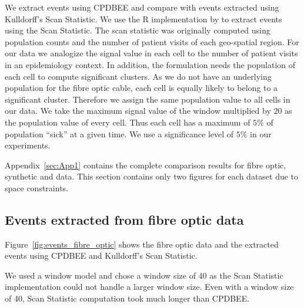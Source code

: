 \documentclass[a4paper,11pt]{article}
\begin{document}
We extract events using CPDBEE and compare with events extracted using Kulldorff's Scan Statistic. We use the R implementation by \cite{spatialepi} to extract events using the Scan Statistic. The scan statistic was originally computed using population counts and the number of patient visits of each geo-spatial region. For our data we analogize the signal value in each cell to the number of patient visits in an epidemiology context. In addition, the formulation needs the population of each cell to compute significant clusters. As we do not have an underlying population for the fibre optic cable, each cell is equally likely to belong to a significant cluster. Therefore we assign the same population value to all cells in our data. We take the maximum signal value of the window multiplied by $20$ as the population value of every cell. Thus each cell has a maximum of $5\%$ of population ``sick'' at a given time. We use a significance level of $5\%$ in our experiments.

Appendix~\ref{sec:App1}  contains the complete comparison results for fibre optic, synthetic and  data. This section  contains only two figures for each dataset due to space constraints.

\subsection{Events extracted from fibre optic data}\label{subsec:eventsFibre}

Figure~\ref{fig:events_fibre_optic} shows the fibre optic data and the extracted events using CPDBEE and Kulldorff's Scan Statistic.

We used a window model and chose a window size of 40 as the Scan Statistic implementation could not handle a larger window size. Even with a window size of 40, Scan Statistic computation took much longer than CPDBEE.
\end{document}
